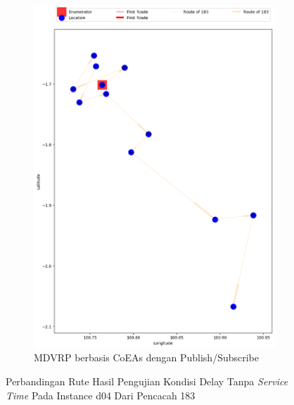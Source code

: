 \begin{figure}[H]\ContinuedFloat
	\centering
	\begin{subfigure}[t]{\textwidth}
		\centering
		\includegraphics[width=\textwidth]{Resources/Images/delayed_4/real_m15_n100_delayed_4_183_pubsub_coes}
		\caption{MDVRP berbasis CoEAs dengan Publish/Subscribe}
		\label{fig:real_m15_n100_delayed_4_183_pubsub_coes}
	\end{subfigure}
	\caption{Perbandingan Rute Hasil Pengujian Kondisi Delay Tanpa \textit{Service Time} Pada Instance d04 Dari Pencacah 183}
	\label{fig:real_m15_n100_delayed_4_183_contd}
\end{figure}


